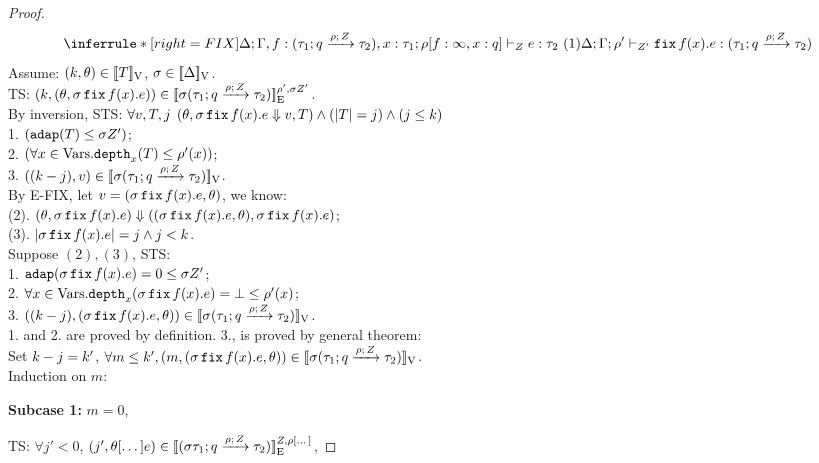 \documentclass[a4paper,11pt]{article}
\theoremstyle{definition}
\begin{document}
\begin{proof}
\[
    \inferrule*[right = FIX]
    {
      \Delta; \Gamma, f: (\tarr{\type_1}{\type_2}{\nnatbiA}{\dmap}{\nnatA}), x: \type_1;
      \dmap[f: \infty, x: \nnatbiA]
      \tvdash{\nnatA}
      \expr: \type_2
       ~ (1)
    }
    {
      \Delta; \Gamma; \dmap' \tvdash{\nnatA'} \efix f(x).\expr: (\tarr{\type_1}{\type_2}{\nnatbiA}{\dmap}{\nnatA})
    }
\]
Assume: $(\stepiA, \env) \in \lrv{\tr}$, $ \ienv \in \lrv{\Delta}$.\\
%
TS: $(\stepiA, (\env, \ienv \efix f(x). \expr)) \in \lre{\dmap'}{\ienv \nnatA'}{\ienv (\tarr{\type_1}{\type_2}{\nnatbiA}{\dmap}{\nnatA}) }$.\\
%
By inversion, 
STS: $\forall \valr, \tr, j$ 
$(\env, \ienv \efix f(x). \expr \bigstep \valr, \tr) \land (\size{\tr} = j) \land (j \leq \stepiA)$\\
%
1. $(\adap(\tr) \leq \ienv \nnatA') $;\\
%
2. $ (\forall x \in \mbox{Vars}. \ddep{x}(\tr) \leq \dmap'(x)) $;\\
%
3. $ ((\stepiA - j), \valr) \in \lrv{\ienv  (\tarr{\type_1}{\type_2}{\nnatbiA}{\dmap}{\nnatA})}$.\\
%
By E-FIX, let $\valr = (\ienv \efix f(x). \expr, \env)$, we know:\\
%
(2). $(\env, \ienv \efix f(x). \expr) \bigstep ((\ienv \efix f(x). \expr, \env), \ienv \efix f(x). \expr) $;\\
%
(3). $|\ienv \efix f(x). \expr|= j \land j < \stepiA$.\\
%
Suppose $(2), (3)$, STS:\\
%
1. $ \adap(\ienv \efix f(x). \expr) = 0 \leq \ienv \nnatA'$;\\
%
2. $ \forall x \in \mbox{Vars}. \ddep{x}(\ienv \efix f(x). \expr) = \bot \leq \dmap'(x) $;\\
%
3. $((\stepiA -j), (\ienv \efix f(x). \expr, \env)) \in \lrv{\ienv (\tarr{\type_1}{\type_2}{\nnatbiA}{\dmap}{\nnatA})}$.\\
%
1. and 2. are proved by definition.
3., is proved by general theorem: \\
%
Set $\stepiA - j = \stepiA'$, $\forall m \leq \stepiA', (m, (\ienv \efix f(x). \expr, \env)) \in \lrv{\ienv (\tarr{\type_1}{\type_2}{\nnatbiA}{\dmap}{\nnatA})}$.\\
%
Induction on $m$:

{\bf Subcase 1:} $m = 0$,

	TS: $\forall j' < 0$, $(j', \env[\dots] \expr) \in \lre{\nnatA}{\dmap[\dots]}{(\ienv \tarr{\type_1}{\type_2}{\nnatbiA}{\dmap}{\nnatA})}$,
	

\end{proof}
\end{document}
